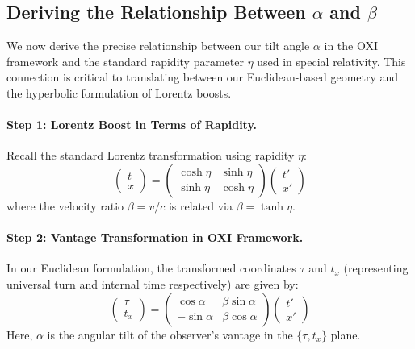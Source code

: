 \documentclass{article}
\begin{document}
\subsection{Deriving the Relationship Between $\alpha$ and $\beta$}

We now derive the precise relationship between our tilt angle $\alpha$ in the OXI framework and the standard rapidity parameter $\eta$ used in special relativity. This connection is critical to translating between our Euclidean-based geometry and the hyperbolic formulation of Lorentz boosts.

\paragraph{Step 1: Lorentz Boost in Terms of Rapidity.} Recall the standard Lorentz transformation using rapidity $\eta$:
\begin{equation}
\begin{pmatrix} t \\ x \end{pmatrix} = 
\begin{pmatrix} \cosh\eta & \sinh\eta \\
                 \sinh\eta & \cosh\eta \end{pmatrix}
\begin{pmatrix} t' \\ x' \end{pmatrix}
\end{equation}
where the velocity ratio $\beta = v/c$ is related via $\beta = \tanh\eta$.

\paragraph{Step 2: Vantage Transformation in OXI Framework.} In our Euclidean formulation, the transformed coordinates $\tau$ and $t_x$ (representing universal turn and internal time respectively) are given by:
\begin{equation}
\begin{pmatrix} \tau \\ t_x \end{pmatrix} = 
\begin{pmatrix} \cos\alpha & \beta\sin\alpha \\
                -\sin\alpha & \beta\cos\alpha \end{pmatrix}
\begin{pmatrix} t' \\ x' \end{pmatrix}
\end{equation}
Here, $\alpha$ is the angular tilt of the observer's vantage in the $\{\tau, t_x\}$ plane.
\end{document}
